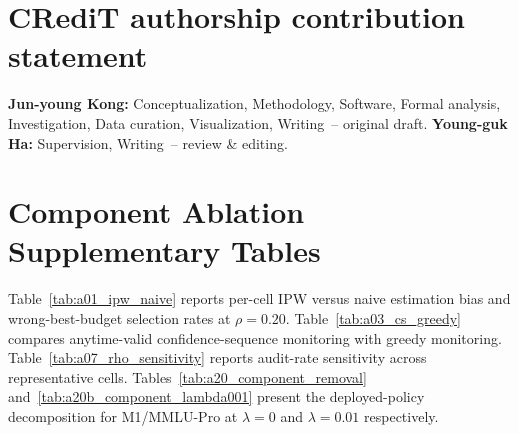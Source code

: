 \documentclass[a4paper,fleqn]{cas-sc}
\theoremstyle{plain}
\theoremstyle{definition}
\theoremstyle{remark}
\begin{document}
\section*{CRediT authorship contribution statement}
\textbf{Jun-young Kong:} Conceptualization, Methodology, Software, Formal
analysis, Investigation, Data curation, Visualization, Writing~-- original draft.
\textbf{Young-guk Ha:} Supervision, Writing~-- review \& editing.

\FloatBarrier




\appendix
\section{Component Ablation Supplementary Tables}
\label{app:ablation_tables}

Table~\ref{tab:a01_ipw_naive} reports per-cell IPW versus naive estimation
bias and wrong-best-budget selection rates at $\rho=0.20$.
Table~\ref{tab:a03_cs_greedy} compares anytime-valid confidence-sequence
monitoring with greedy monitoring.
Table~\ref{tab:a07_rho_sensitivity} reports audit-rate sensitivity across
representative cells.
Tables~\ref{tab:a20_component_removal} and~\ref{tab:a20b_component_lambda001}
present the deployed-policy decomposition for M1/MMLU-Pro at $\lambda=0$
and $\lambda=0.01$ respectively.


\Needspace{0.37\textheight}
\par\medskip
\end{document}
